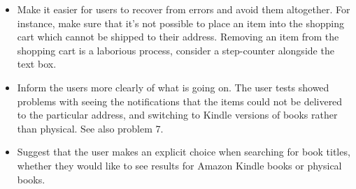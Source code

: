 \begin{enumerate}[a.]
\begin{itemize}

\item Make it easier for users to recover from errors and avoid them
altogether. For instance, make sure that it's not possible to place an item
into the shopping cart which cannot be shipped to their address. Removing an
item from the shopping cart is a laborious process, consider a step-counter
alongside the text box.

\item Inform the users more clearly of what is going on. The user tests showed
problems with seeing the notifications that the items could not be delivered to
the particular address, and switching to Kindle versions of books rather than
physical. See also problem 7.

\item Suggest that the user makes an explicit choice when searching for book
titles, whether they would like to see results for Amazon Kindle books or
physical books.

\end{itemize}

\end{enumerate}

